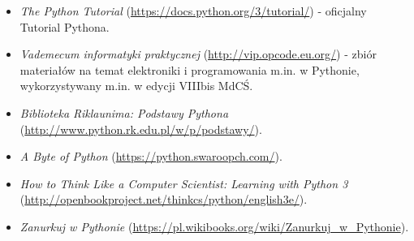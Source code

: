 \documentclass{pdfBooklets}
\begin{document}
\begin{itemize}
\item \emph{The Python Tutorial} (\url{https://docs.python.org/3/tutorial/}) - oficjalny Tutorial Pythona.
\item \emph{Vademecum informatyki praktycznej} (\url{http://vip.opcode.eu.org/}) - zbiór materiałów na temat elektroniki i programowania m.in. w Pythonie, wykorzystywany m.in. w edycji VIIIbis MdCŚ.
\item \emph{Biblioteka Riklaunima: Podstawy Pythona} (\url{http://www.python.rk.edu.pl/w/p/podstawy/}).
\item \emph{A Byte of Python} (\url{https://python.swaroopch.com/}).
\item \emph{How to Think Like a Computer Scientist: Learning with Python 3} (\url{http://openbookproject.net/thinkcs/python/english3e/}).
\item \emph{Zanurkuj w Pythonie} (\url{https://pl.wikibooks.org/wiki/Zanurkuj_w_Pythonie}).
\end{itemize}

\rozwiazania

\end{document}
